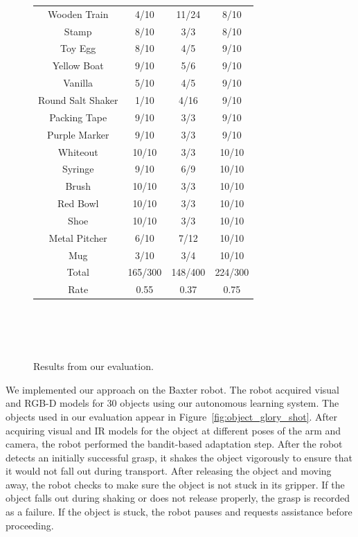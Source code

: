 \documentclass[conference,onecolumn]{IEEEtran}
\begin{document}
\begin{figure}
{{\begin{tabular}{cccc}
Wooden Train        & 4/10          &  11/24       &  8/10 \\
Stamp    	    & 8/10          &  3/3         &  8/10 \\
Toy Egg    	    & 8/10          &  4/5         &  9/10 \\
Yellow Boat    	    & 9/10          &  5/6         &  9/10 \\
Vanilla	   	    & 5/10          &  4/5         &  9/10 \\
Round Salt Shaker   & 1/10          &  4/16        &  9/10 \\
Packing Tape        & 9/10          &  3/3         &  9/10 \\
Purple Marker       & 9/10          &  3/3         &  9/10 \\
Whiteout    	    & 10/10         &  3/3         &  10/10\\
Syringe    	    & 9/10          &  6/9         &  10/10\\
Brush    	    & 10/10         &  3/3         &  10/10\\
Red Bowl    	    & 10/10         &  3/3         &  10/10\\
Shoe    	    & 10/10         &  3/3         &  10/10\\
Metal Pitcher       & 6/10          &  7/12        &  10/10\\
Mug    		    & 3/10          &  3/4         &  10/10\\
\midrule
Total		    & 165/300       &  148/400     & 224/300\\
Rate		    & 0.55          &  0.37        & 0.75\\
\bottomrule
\end{tabular}
~\\~
~\\~
}}
\caption{Results from our evaluation. \label{fig:evaluation}}
\end{figure}

We implemented our approach on the Baxter robot.  The robot acquired
visual and 
RGB-D models for 30 objects using our autonomous learning
system.  The objects used in our evaluation appear in
Figure~\ref{fig:object_glory_shot}.  After acquiring visual and IR
models for the object at different poses of the arm and camera, the
robot performed the bandit-based adaptation step.  After the robot
detects an initially successful grasp, it shakes the object vigorously
to ensure that it would not fall out during transport. After releasing
the object and moving away, the robot checks to make sure the object
is not stuck in its gripper. If the object falls out during shaking or
does not release properly, the grasp is recorded as a failure. If the
object is stuck, the robot pauses and requests assistance before
proceeding.
\end{document}

